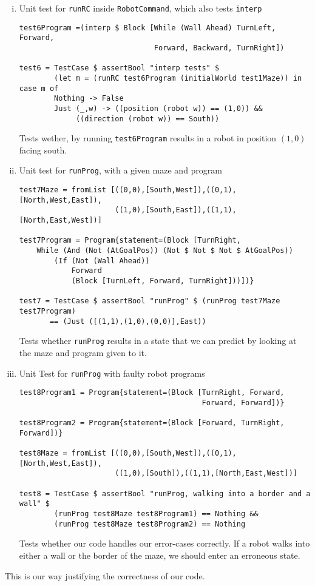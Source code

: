 \documentclass[a4paper,10pt]{article}
\begin{document}
\begin{enumerate}[i.]
\item Unit test for \verb=runRC= inside \verb=RobotCommand=, which also tests \verb=interp=
\begin{verbatim}
test6Program =(interp $ Block [While (Wall Ahead) TurnLeft, Forward, 
                               Forward, Backward, TurnRight])

test6 = TestCase $ assertBool "interp tests" $ 
        (let m = (runRC test6Program (initialWorld test1Maze)) in case m of
        Nothing -> False 
        Just (_,w) -> ((position (robot w)) == (1,0)) && 
             ((direction (robot w)) == South))
\end{verbatim}
Tests wether, by running \verb=test6Program= results in a robot in position $(1,0)$ facing south.

\item Unit test for \verb=runProg=, with a given maze and program
\begin{verbatim}
test7Maze = fromList [((0,0),[South,West]),((0,1),[North,West,East]),
                      ((1,0),[South,East]),((1,1),[North,East,West])]

test7Program = Program{statement=(Block [TurnRight,
    While (And (Not (AtGoalPos)) (Not $ Not $ Not $ AtGoalPos))
        (If (Not (Wall Ahead))
            Forward
            (Block [TurnLeft, Forward, TurnRight]))])} 

test7 = TestCase $ assertBool "runProg" $ (runProg test7Maze test7Program)
       == (Just ([(1,1),(1,0),(0,0)],East))
\end{verbatim}
Tests whether \verb=runProg= results in a state that we can predict by looking at the maze and program given to it.

\item Unit Test for \verb=runProg= with faulty robot programs
\begin{verbatim}
test8Program1 = Program{statement=(Block [TurnRight, Forward, 
                                          Forward, Forward])}

test8Program2 = Program{statement=(Block [Forward, TurnRight, Forward])}

test8Maze = fromList [((0,0),[South,West]),((0,1),[North,West,East]),
                      ((1,0),[South]),((1,1),[North,East,West])]

test8 = TestCase $ assertBool "runProg, walking into a border and a wall" $
        (runProg test8Maze test8Program1) == Nothing &&
        (runProg test8Maze test8Program2) == Nothing
\end{verbatim}
Tests whether our code handles our error-cases correctly. If a robot walks into either a wall or the border of the maze, we should enter an erroneous state.
\end{enumerate}
This is our way justifying the correctness of our code.
\end{document}
